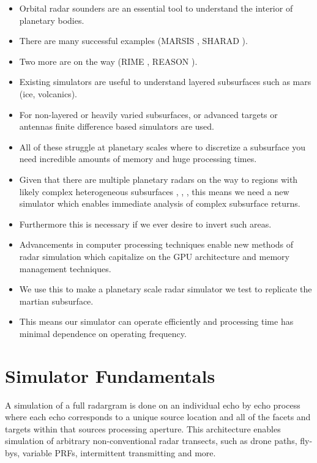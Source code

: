 \documentclass[lettersize,journal]{IEEEtran}
\begin{document}
\begin{itemize}
    \item Orbital radar sounders are an essential tool to understand the interior of planetary bodies.
    \item There are many successful examples (MARSIS \cite{jordan_mars_2009}, SHARAD \cite{seu_sharad_2007}).
    \item Two more are on the way (RIME \cite{bruzzone_rime_2013}, REASON \cite{blankenship_radar_2024}).
    \item Existing simulators are useful to understand layered subsurfaces such as mars (ice, volcanics). \cite{gerekos_coherent_2018}
    \item For non-layered or heavily varied subsurfaces, or advanced targets or antennas finite difference based simulators are used. \cite{warren_gprmax_2016}
    \item All of these struggle at planetary scales where to discretize a subsurface you need incredible amounts of memory and huge processing times. \cite{thakur_approach_2021}
    \item Given that there are multiple planetary radars on the way to regions with likely complex heterogeneous subsurfaces \cite{schmidt_active_2011}, \cite{dicarlofelice_new_2024}, \cite{culberg_double_2022}, \cite{matteoni_evolution_2023} this means we need a new simulator which enables immediate analysis of complex subsurface returns. 
    \item Furthermore this is necessary if we ever desire to invert such areas. 
    \item Advancements in computer processing techniques enable new methods of radar simulation which capitalize on the GPU architecture and memory management techniques.
    \item We use this to make a planetary scale radar simulator we test to replicate the martian subsurface. 
    \item This means our simulator can operate efficiently and processing time has minimal dependence on operating frequency.
\end{itemize}

\section{Simulator Fundamentals}

A simulation of a full radargram is done on an individual echo by echo process where each echo corresponds to a unique source location and all of the facets and targets within that sources processing aperture. This architecture enables simulation of arbitrary non-conventional radar transects, such as drone paths, fly-bys, variable PRFs, intermittent transmitting and more. 
\end{document}
